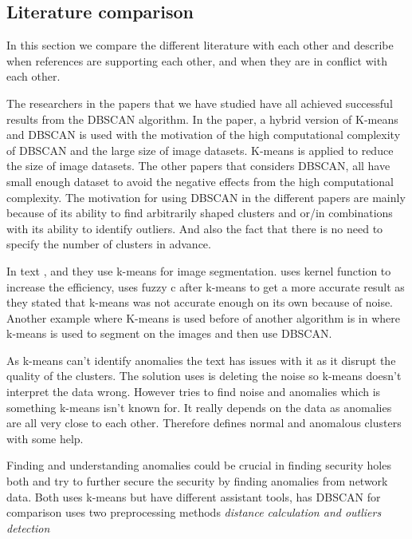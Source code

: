 \documentclass[a4paper]{article}
\begin{document}
\subsection{Literature comparison}
In this section we compare the different literature with each other and describe when references are supporting each other, and  when they are in conflict with each other.

The researchers in the papers that we have studied have all
achieved successful results from the DBSCAN algorithm. In the paper\cite{k-meansDBSCANhybird}, a hybrid version of K-means
and DBSCAN is used with the motivation of the high computational complexity of DBSCAN and the large size of image datasets. K-means is applied to reduce the size of image datasets. The other papers that considers DBSCAN, all have small enough dataset to avoid the negative effects from the high computational complexity. The motivation for using DBSCAN in the different papers are mainly because of its ability to find arbitrarily shaped clusters and or/in combinations with its ability to identify outliers. And also the fact that there is no need to specify the number of clusters in advance.

In text \cite{imageSeg}, \cite{k-meansDBSCANhybird} and \cite{imageSegBrain} they use k-means for image segmentation. \cite{imageSeg} uses kernel function to increase the efficiency, \cite{imageSegBrain} uses fuzzy c after k-means to get a more accurate result as they stated that k-means was not accurate enough on its own because of noise. Another example where K-means is used before of another algorithm is in \cite{k-meansDBSCANhybird} where k-means is used to segment on the images and then use DBSCAN. 

As k-means can't identify anomalies the text \cite{imageSegBrain} has issues with it as it disrupt the quality of the clusters. The solution \cite{imageSegBrain} uses is deleting the noise so k-means doesn't interpret the data wrong. However \cite{k-meansOutlier} tries to find noise and anomalies which is something k-means isn't known for. It really depends on the data as \cite{k-meansOutlier} anomalies are all very close to each other. Therefore \cite{k-meansOutlier} defines normal and anomalous clusters with some help.

Finding and understanding anomalies could be crucial in finding security holes both \cite{erman2006traffic} and \cite{k-meansOutlier} try to further secure the security by finding anomalies from network data. Both uses k-means but have different assistant tools, \cite{erman2006traffic} has DBSCAN for comparison \cite{k-meansOutlier} uses two preprocessing methods \textit{distance calculation and outliers detection}
\end{document}
